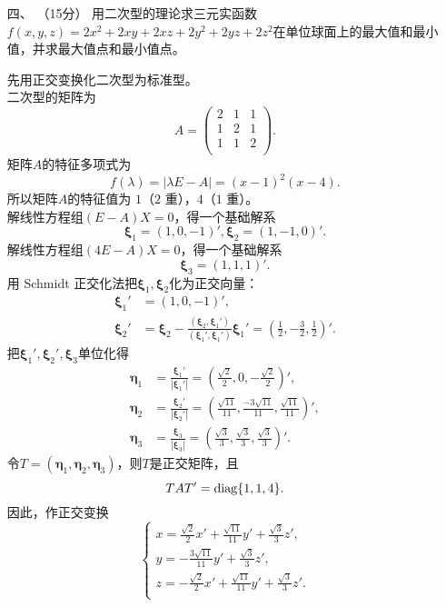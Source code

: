 \begin{enumerate}[1~]
\item[四、]（15分）
用二次型的理论求三元实函数$f ( x , y , z ) = 2 x ^ { 2 } + 2 x y + 2 x z + 2 y ^ { 2 } + 2 y z + 2 z ^ { 2 }$在单位球面上的最大值和最小值，并求最大值点和最小值点。
\begin{solution}
先用正交变换化二次型为标准型。\\
二次型的矩阵为\[
A=\left( \begin{matrix}
	2&		1&		1\\
	1&		2&		1\\
	1&		1&		2\\
\end{matrix} \right).
\]
矩阵$A$的特征多项式为\[
f(\lambda)=|\lambda E-A|=(x-1)^2(x-4).
\]
所以矩阵$A$的特征值为 $1$（$2$ 重），$4$（$1$ 重）。\\
解线性方程组$(E-A)X=0$，得一个基础解系\[
\boldsymbol{\xi}_1 = (1, 0, -1)', \boldsymbol{\xi}_2 = (1, -1, 0)'.
\]
解线性方程组$(4E-A)X=0$，得一个基础解系\[
\boldsymbol{\xi}_3 = (1, 1, 1)'.
\]
用 Schmidt 正交化法把$\boldsymbol{\xi}_1, \boldsymbol{\xi}_2$化为正交向量：\begin{align*}
\boldsymbol{\xi}_1'&=(1, 0, -1)',\\
\boldsymbol{\xi}_2'&=\boldsymbol{\xi}_2-\frac{(\boldsymbol{\xi}_2, \boldsymbol{\xi}_1')}{(\boldsymbol{\xi}_1', \boldsymbol{\xi}_1')}\boldsymbol{\xi}_1'=\left(\frac12, -\frac32, \frac12\right)'.
\end{align*}
把$\boldsymbol{\xi}_1', \boldsymbol{\xi}_2', \boldsymbol{\xi}_3$单位化得\begin{align*}
\boldsymbol{\eta}_1&=\frac{\boldsymbol{\xi}_1'}{|\boldsymbol{\xi}_1'|}=\left(\frac{\sqrt{2}}{2}, 0, -\frac{\sqrt{2}}{2}\right)',\\
\boldsymbol{\eta}_2&=\frac{\boldsymbol{\xi}_2'}{|\boldsymbol{\xi}_2'|}=\left(\frac{\sqrt{11}}{11}, \frac{-3\sqrt{11}}{11}, \frac{\sqrt{11}}{11}\right)',\\
\boldsymbol{\eta}_3&=\frac{\boldsymbol{\xi}_3}{|\boldsymbol{\xi}_3|}=\left(\frac{\sqrt{3}}{3}, \frac{\sqrt{3}}{3}, \frac{\sqrt{3}}{3}\right)'.
\end{align*}
令$T=(\boldsymbol{\eta}_1, \boldsymbol{\eta}_2, \boldsymbol{\eta}_3)$，则$T$是正交矩阵，且\[
TAT'={\rm diag}\{1, 1, 4\}.
\]
因此，作正交变换\[
\left\{ \begin{array}{l}
	x=\frac{\sqrt{2}}{2}x'+\frac{\sqrt{11}}{11}y'+\frac{\sqrt{3}}{3}z',\\
	y=-\frac{3\sqrt{11}}{11}y'+\frac{\sqrt{3}}{3}z',\\
	z=-\frac{\sqrt{2}}{2}x'+\frac{\sqrt{11}}{11}y'+\frac{\sqrt{3}}{3}z'.\\

\end{array}\]
\end{solution}
\end{enumerate}
